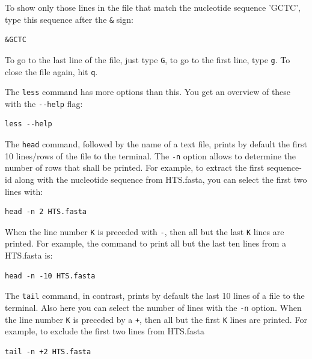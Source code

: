 \documentclass[11pt]{article}
\begin{document}
To show only those lines in the file that match the nucleotide
sequence 'GCTC', type this sequence after the \texttt{\&} sign:

\begin{verbatim}
&GCTC
\end{verbatim}

To go to the last line of the file, just type \texttt{G}, to go to the first
line, type \texttt{g}. To close the file again, hit \texttt{q}.


The \texttt{less} command has more options than this. You get an overview of
these with the \texttt{-{}-help} flag:

\begin{verbatim}
less --help
\end{verbatim}


The \texttt{head} command, followed by the name of a text file, prints by
default the first 10 lines/rows of the file to the terminal.  The \texttt{-n}
option allows to determine the number of rows that shall be
printed. For example, to extract the first sequence-id along with the
nucleotide sequence from HTS.fasta, you can select the first two lines
with:

\begin{verbatim}
head -n 2 HTS.fasta
\end{verbatim}

When the line number \texttt{K} is preceded with \texttt{-}, then all but the last \texttt{K}
lines are printed. For example, the command to print all but the last
ten lines from a HTS.fasta is:

\begin{verbatim}
head -n -10 HTS.fasta
\end{verbatim}

The \texttt{tail} command, in contrast, prints by default the last 10 lines
of a file to the terminal. Also here you can select the number of
lines with the \texttt{-n} option. When the line number \texttt{K} is preceded by a
\texttt{+}, then all but the first \texttt{K} lines are printed.  For example, to
exclude the first two lines from HTS.fasta

\begin{verbatim}
tail -n +2 HTS.fasta
\end{verbatim}
\end{document}
